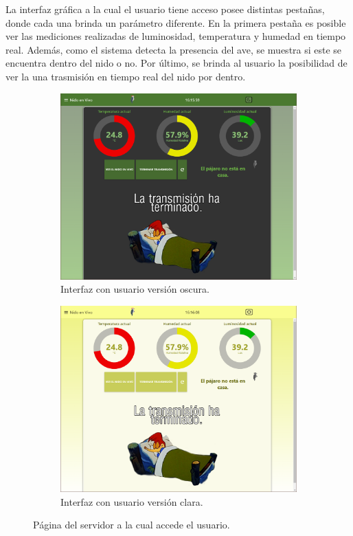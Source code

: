 La interfaz gráfica a la cual el usuario tiene acceso posee distintas pestañas, donde cada una brinda un parámetro diferente. En la primera pestaña es posible ver las mediciones realizadas de luminosidad, temperatura y humedad en tiempo real. Además, como el sistema detecta la presencia del ave, se muestra si este se encuentra dentro del nido o no. Por último, se brinda al usuario la posibilidad de ver la una trasmisión en tiempo real del nido por dentro.
\begin{figure}[H]
\centering
    	\begin{subfigure}{0.49\textwidth}
        	\centering
        	\includegraphics[width=\linewidth]{ImagenesIngenieria de Detalle/Node-Red-Live-Dark}		
			\caption{Interfaz con usuario versión oscura.}
			\label{fig:front_end_dark}
        \end{subfigure}\hfill
        \begin{subfigure}{0.49\textwidth}
        	\centering
        	\includegraphics[width=\linewidth]{ImagenesIngenieria de Detalle/Node-Red-Live-Light}				
        	\caption{Interfaz con usuario versión clara.}
			\label{fig:front_end_light}
        \end{subfigure}
	\caption{Página del servidor a la cual accede el usuario.}
	\label{fig:node_red_live}
\end{figure}

